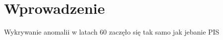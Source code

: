 \chapter{Wprowadzenie}
\label{chap:wstep}

Wykrywanie anomalii w latach 60 zaczęło się tak samo jak jebanie PIS\cite{ODin60s}\cite{wangnew2021}\cite{suri2019outlier}\cite{bulusu2020anomalous}\cite{mehrotra2017anomaly}\cite{suri2019outlier}